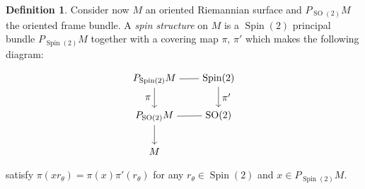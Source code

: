 \documentclass[12pt]{amsart}
\theoremstyle{definition}
\newtheorem{definition}[proposition]{Definition}
\newcommand{\so}{\operatorname{SO}}
\newcommand{\spin}{\operatorname{Spin}}
\begin{document}
\begin{definition}\label{def-spinstructure}
	Consider now $M$ an oriented Riemannian surface and $P_{\so(2)}M$ the oriented frame bundle. A \emph{spin structure} on $M$ is a $\spin(2)$ principal bundle $P_{\spin(2)}M$ together with a covering map $\pi$, $\pi'$ which makes the following diagram:
	\begin{equation}\label{spinStructureDiagram}
		\begin{tikzpicture}[baseline=(current  bounding  box.center)]
			\matrix (m) [matrix of math nodes,row sep=2em,column sep=2em,minimum width=2em]
			{
				P_{\text{Spin}(2)} M & \text{Spin}(2) \\
				P_{\text{SO}(2)} M & \text{SO}(2) \\
				M & {} \\  
			};
			\path
			(m-1-1) edge node [ above] {} (m-1-2)
			(m-2-1) edge node [below] {} (m-2-2);
			
			
			\path[->] 
			(m-1-1) edge node [left]{$\pi$} (m-2-1)
			(m-1-2) edge node [right] {$\pi'$} (m-2-2)
			(m-2-1) edge node [left] {} (m-3-1);
		\end{tikzpicture}
	\end{equation}
	satisfy $\pi(xr_{\theta}) = \pi(x) \pi'(r_{\theta})$ for any $r_{\theta}\in \spin(2)$ and $x \in P_{\spin(2)} M$.
\end{definition}
\end{document}
